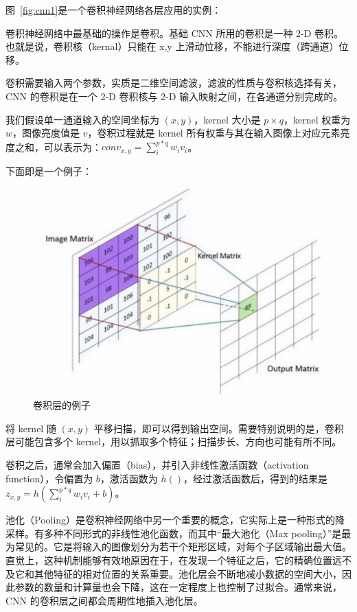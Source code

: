 图~\ref{fig:cnn1}是一个卷积神经网络各层应用的实例：


卷积神经网络中最基础的操作是卷积。基础 CNN 所用的卷积是一种 2-D 卷积。也就是说，卷积核（kernal）只能在 x,y 上滑动位移，不能进行深度（跨通道）位移。

卷积需要输入两个参数，实质是二维空间滤波，滤波的性质与卷积核选择有关，CNN 的卷积是在一个 2-D 卷积核与 2-D 输入映射之间，在各通道分别完成的。

我们假设单一通道输入的空间坐标为 ${\displaystyle (x,y)}$，kernel 大小是 ${\displaystyle p \times q}$，kernel 权重为 ${\displaystyle w}$，图像亮度值是 ${\displaystyle v}$，卷积过程就是 kernel 所有权重与其在输入图像上对应元素亮度之和，可以表示为：${\displaystyle conv_{x,y} = \sum_i^{p*q}w_i v_i}$。

下面即是一个例子：

\begin{figure}[ht]
    \centering
    \includegraphics[width=\linewidth]{figures/cnn_conv}
    \caption{卷积层的例子}
    \label{fig:cnn_conv}
\end{figure}

将 kernel 随 ${\displaystyle (x,y)}$ 平移扫描，即可以得到输出空间。需要特别说明的是，卷积层可能包含多个 kernel，用以抓取多个特征；扫描步长、方向也可能有所不同。

卷积之后，通常会加入偏置（bias），并引入非线性激活函数（activation function），令偏置为 ${\displaystyle b}$，激活函数为 ${\displaystyle h\left(\right)}$，经过激活函数后，得到的结果是 ${\displaystyle z_{x,y}=h\left(\sum_i^{p*q} w_i v_i +b\right)}$。

池化（Pooling）是卷积神经网络中另一个重要的概念，它实际上是一种形式的降采样。有多种不同形式的非线性池化函数，而其中“最大池化（Max pooling）”是最为常见的。它是将输入的图像划分为若干个矩形区域，对每个子区域输出最大值。直觉上，这种机制能够有效地原因在于，在发现一个特征之后，它的精确位置远不及它和其他特征的相对位置的关系重要。池化层会不断地减小数据的空间大小，因此参数的数量和计算量也会下降，这在一定程度上也控制了过拟合。通常来说，CNN 的卷积层之间都会周期性地插入池化层。

